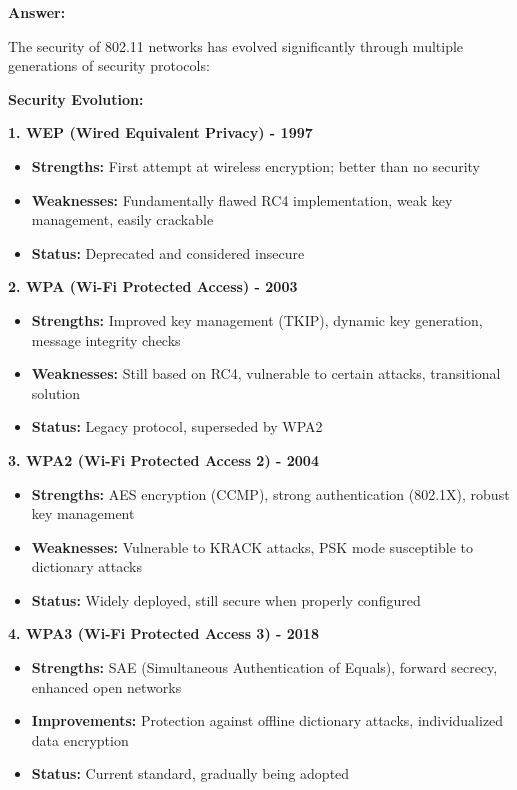 \documentclass[12pt,a4paper]{article}
\begin{document}
\textbf{Answer:}

The security of 802.11 networks has evolved significantly through multiple generations of security protocols:

\textbf{Security Evolution:}

\textbf{1. WEP (Wired Equivalent Privacy) - 1997}
\begin{itemize}
    \item \textbf{Strengths:} First attempt at wireless encryption; better than no security
    \item \textbf{Weaknesses:} Fundamentally flawed RC4 implementation, weak key management, easily crackable
    \item \textbf{Status:} Deprecated and considered insecure
\end{itemize}

\textbf{2. WPA (Wi-Fi Protected Access) - 2003}
\begin{itemize}
    \item \textbf{Strengths:} Improved key management (TKIP), dynamic key generation, message integrity checks
    \item \textbf{Weaknesses:} Still based on RC4, vulnerable to certain attacks, transitional solution
    \item \textbf{Status:} Legacy protocol, superseded by WPA2
\end{itemize}

\textbf{3. WPA2 (Wi-Fi Protected Access 2) - 2004}
\begin{itemize}
    \item \textbf{Strengths:} AES encryption (CCMP), strong authentication (802.1X), robust key management
    \item \textbf{Weaknesses:} Vulnerable to KRACK attacks, PSK mode susceptible to dictionary attacks
    \item \textbf{Status:} Widely deployed, still secure when properly configured
\end{itemize}

\textbf{4. WPA3 (Wi-Fi Protected Access 3) - 2018}
\begin{itemize}
    \item \textbf{Strengths:} SAE (Simultaneous Authentication of Equals), forward secrecy, enhanced open networks
    \item \textbf{Improvements:} Protection against offline dictionary attacks, individualized data encryption
    \item \textbf{Status:} Current standard, gradually being adopted
\end{itemize}
\end{document}
